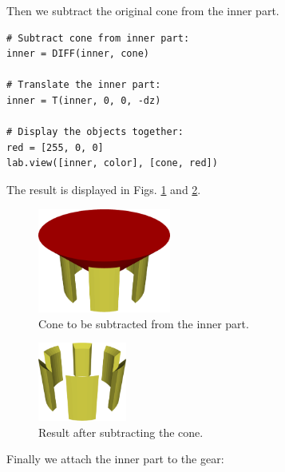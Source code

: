 \noindent
Then we subtract the original cone from the inner part. \\

{\small
\begin{bbox}
\begin{verbatim}
# Subtract cone from inner part:
inner = DIFF(inner, cone)

# Translate the inner part:
inner = T(inner, 0, 0, -dz)

# Display the objects together:
red = [255, 0, 0]
lab.view([inner, color], [cone, red])
\end{verbatim}
\end{bbox}
}
\vspace{6mm}

\noindent
The result is displayed in Figs. \ref{fig:gear-10} and \ref{fig:gear-12}.\\

\begin{figure}[!ht]
\begin{center}
\includegraphics[width=0.39\textwidth]{img/gear-10.png}
\end{center}
\vspace{-4mm}
\caption{Cone to be subtracted from the inner part.}
\label{fig:gear-10}
\end{figure}
\noindent

\begin{figure}[!ht]
\begin{center}
\includegraphics[width=0.26\textwidth]{img/gear-12.png}
\end{center}
\vspace{-4mm}
\caption{Result after subtracting the cone.}
\label{fig:gear-12}
\end{figure}
\newpage
\noindent
Finally we attach the inner part to the gear:

